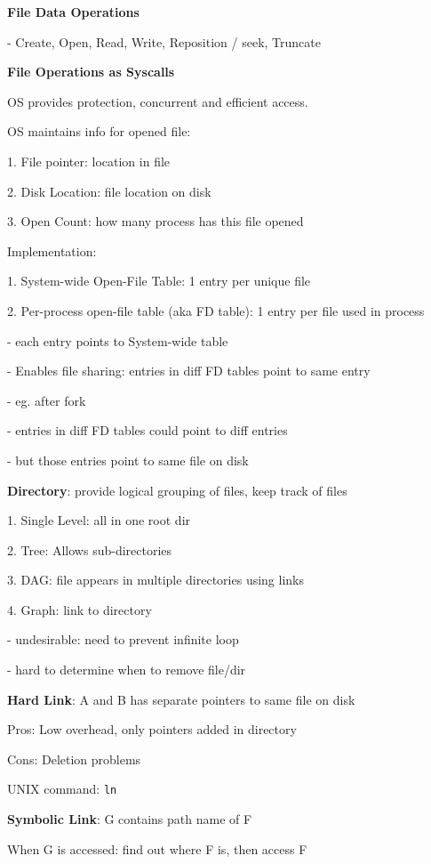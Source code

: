 \documentclass[10pt, a4paper]{article}
\newcommand{\blue}[1]{{\color{MidnightBlue}#1}}
\newcommand{\red}[1]{{\color{red}#1}}
\newcommand{\green}[1]{{\color{ForestGreen}#1}}
\newcommand{\tab}[0]{\hspace*{2mm}}
\begin{document}
\begin{multicols*}{3}
		\textbf{File Data Operations}

		- Create, Open, Read, Write, Reposition / seek, Truncate

		\textbf{File Operations as Syscalls}

		OS provides \blue{protection, concurrent and efficient access}. 

		OS maintains info for opened file:

		1. File pointer: location in file

		2. Disk Location: file location on disk

		3. Open Count: how many process has this file opened

		Implementation:

		1. System-wide Open-File Table: 1 entry per \blue{unique} file

		2. Per-process open-file table (aka FD table): 1 entry per file \blue{used in process}

		\tab{} - each entry points to \red{System-wide table}

		\tab{} - Enables file sharing: entries in diff FD tables point to same entry 

		\tab{}\tab{} - eg. after fork

		\tab{} - entries in diff FD tables could point to diff entries

		\tab{}\tab{} - but those entries point to same file on disk

		\textbf{Directory}: provide logical grouping of files, keep track of files

		1. Single Level: all in one root dir

		2. Tree: Allows sub-directories

		3. DAG: file appears in multiple directories using \red{links}

		4. Graph: link to directory

		\tab{} - undesirable: need to prevent infinite loop
		
		\tab{} - hard to determine when to remove file/dir

		\textbf{Hard Link}: A and B has \red{separate} pointers to \blue{same file} on disk

		\green{Pros}: Low overhead, only pointers added in directory

		\red{Cons}: Deletion problems

		UNIX command: \texttt{ln}

		\textbf{Symbolic Link}: G contains path name of F

		When G is accessed: find out where F is, then access F


\end{multicols*}
\end{document}
